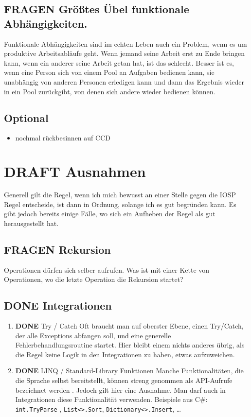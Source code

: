 \documentclass[a4paper,12pt,oneside]{book}
\begin{document}
\subsection{FRAGEN Größtes Übel funktionale Abhängigkeiten.}
\label{sec-4-6-2}
Funktionale Abhängigkeiten sind im echten Leben auch ein Problem, wenn es um
produktive Arbeitsabläufe geht.
Wenn jemand seine Arbeit erst zu Ende bringen kann, wenn ein anderer seine Arbeit
getan hat, ist das schlecht.
Besser ist es, wenn eine Person sich von einem Pool an Aufgaben bedienen kann,
sie unabhängig von anderen Personen erledigen kann und dann das Ergebnis wieder
in ein Pool zurückgibt, von denen sich andere wieder bedienen können.


\subsection{Optional}
\label{sec-4-6-3}
\begin{itemize}
\item nochmal rückbesinnen auf CCD
\end{itemize}
\section{DRAFT Ausnahmen}
\label{sec-4-7}
Generell gilt die Regel, wenn ich mich bewusst an einer Stelle gegen die IOSP
Regel entscheide, ist dann in Ordnung, solange ich es gut begründen kann.
Es gibt jedoch bereits einige Fälle, wo sich ein Aufheben der Regel als gut
herausgestellt hat.
\subsection{FRAGEN Rekursion}
\label{sec-4-7-1}
Operationen dürfen sich selber aufrufen.
Was ist mit einer Kette von Operationen, wo die letzte Operation die Rekursion startet?
\subsection{{\bfseries\sffamily DONE} Integrationen}
\label{sec-4-7-2}
\begin{enumerate}
\item {\bfseries\sffamily DONE} Try / Catch
\label{sec-4-7-2-1}
Oft braucht man auf oberster Ebene, einen Try/Catch, der alle Exceptions abfangen soll, und eine generelle Fehlerbehandlungsroutine
startet. Hier bleibt einem nichts anderes übrig, als die Regel keine Logik in den Integrationen zu haben, etwas aufzuweichen.

\item {\bfseries\sffamily DONE} LINQ / Standard-Library Funktionen
\label{sec-4-7-2-2}
Manche Funktionalitäten, die die Sprache selbst bereitstellt, können streng genommen als API-Aufrufe bezeichnet werden
. Jedoch gilt hier eine Ausnahme. Man darf auch in Integrationen diese Funktionalität verwenden.
Beispiele aus C\#:
\texttt{int.TryParse} , \texttt{List<>.Sort}, \texttt{Dictionary<>.Insert}, \ldots{}
\end{enumerate}
\end{document}
